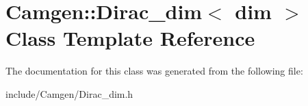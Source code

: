 \hypertarget{a00129}{}\section{Camgen\+:\+:Dirac\+\_\+dim$<$ dim $>$ Class Template Reference}
\label{a00129}


The documentation for this class was generated from the following file\+:\begin{DoxyCompactItemize}
\item 
include/\+Camgen/Dirac\+\_\+dim.\+h\end{DoxyCompactItemize}
